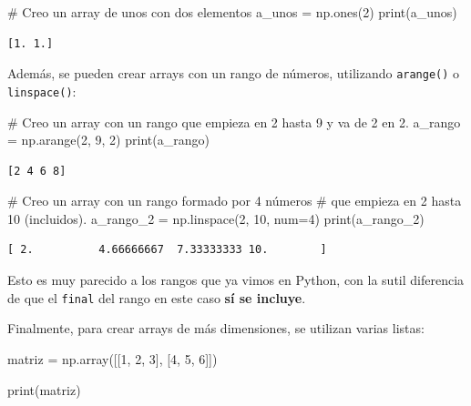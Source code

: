 \documentclass[
  letterpaper,
  DIV=11,
  numbers=noendperiod]{scrreprt}
\newenvironment{Shaded}{\begin{snugshade}}{\end{snugshade}}
\newcommand{\BuiltInTok}[1]{\textcolor[rgb]{0.00,0.23,0.31}{#1}}
\newcommand{\CommentTok}[1]{\textcolor[rgb]{0.37,0.37,0.37}{#1}}
\newcommand{\DecValTok}[1]{\textcolor[rgb]{0.68,0.00,0.00}{#1}}
\newcommand{\NormalTok}[1]{\textcolor[rgb]{0.00,0.23,0.31}{#1}}
\newcommand{\OperatorTok}[1]{\textcolor[rgb]{0.37,0.37,0.37}{#1}}
\begin{document}
\begin{Shaded}
\begin{Highlighting}[]
\CommentTok{\# Creo un array de unos con dos elementos}
\NormalTok{a\_unos }\OperatorTok{=}\NormalTok{ np.ones(}\DecValTok{2}\NormalTok{)}
\BuiltInTok{print}\NormalTok{(a\_unos)}
\end{Highlighting}
\end{Shaded}

\begin{verbatim}
[1. 1.]
\end{verbatim}

Además, se pueden crear arrays con un rango de números, utilizando
\texttt{arange()} o \texttt{linspace()}:

\begin{Shaded}
\begin{Highlighting}[]
\CommentTok{\# Creo un array con un rango que empieza en 2 hasta 9 y va de 2 en 2.}
\NormalTok{a\_rango }\OperatorTok{=}\NormalTok{ np.arange(}\DecValTok{2}\NormalTok{, }\DecValTok{9}\NormalTok{, }\DecValTok{2}\NormalTok{)}
\BuiltInTok{print}\NormalTok{(a\_rango)}
\end{Highlighting}
\end{Shaded}

\begin{verbatim}
[2 4 6 8]
\end{verbatim}

\begin{Shaded}
\begin{Highlighting}[]
\CommentTok{\# Creo un array con un rango formado por 4 números}
\CommentTok{\# que empieza en 2 hasta 10 (incluidos). }
\NormalTok{a\_rango\_2 }\OperatorTok{=}\NormalTok{ np.linspace(}\DecValTok{2}\NormalTok{, }\DecValTok{10}\NormalTok{, num}\OperatorTok{=}\DecValTok{4}\NormalTok{)}
\BuiltInTok{print}\NormalTok{(a\_rango\_2)}
\end{Highlighting}
\end{Shaded}

\begin{verbatim}
[ 2.          4.66666667  7.33333333 10.        ]
\end{verbatim}

Esto es muy parecido a los rangos que ya vimos en Python, con la sutil
diferencia de que el \texttt{final} del rango en este caso \textbf{sí se
incluye}.

Finalmente, para crear arrays de más dimensiones, se utilizan varias
listas:

\begin{Shaded}
\begin{Highlighting}[]
\NormalTok{matriz }\OperatorTok{=}\NormalTok{ np.array([[}\DecValTok{1}\NormalTok{, }\DecValTok{2}\NormalTok{, }\DecValTok{3}\NormalTok{], [}\DecValTok{4}\NormalTok{, }\DecValTok{5}\NormalTok{, }\DecValTok{6}\NormalTok{]])}

\BuiltInTok{print}\NormalTok{(matriz)}
\end{Highlighting}
\end{Shaded}
\end{document}
